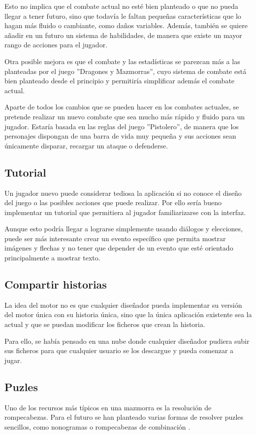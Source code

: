 Esto no implica que el combate actual no esté bien planteado o que no pueda llegar a tener futuro, sino que todavía le faltan pequeñas características que lo hagan más fluido o cambiante, como daños variables.
Además, también se quiere añadir en un futuro un sistema de habilidades, de manera que existe un mayor rango de acciones para el jugador.

Otra posible mejora es que el combate y las estadísticas se parezcan más a las planteadas por el juego ''Dragones y Mazmorras'', cuyo sistema de combate está bien planteado desde el principio y permitiría simplificar además el combate actual.

Aparte de todos los cambios que se pueden hacer en los combates actuales, se pretende realizar un nuevo combate que sea mucho más rápido y fluido para un jugador. Estaría basada en las reglas del juego ''Pistolero'', de manera que los personajes dispongan de una barra de vida muy pequeña y sus acciones sean únicamente disparar, recargar un ataque o defenderse.

\subsection{Tutorial}
Un jugador nuevo puede considerar tediosa la aplicación si no conoce el diseño del juego o las posibles acciones que puede realizar. Por ello sería bueno implementar un tutorial que permitiera al jugador familiarizarse con la interfaz.

Aunque esto podría llegar a lograrse simplemente usando diálogos y elecciones, puede ser más interesante crear un evento específico que permita mostrar imágenes y flechas y no tener que depender de un evento que esté orientado principalmente a mostrar texto.
 
\subsection{Compartir historias}
La idea del motor no es que cualquier diseñador pueda implementar su versión del motor única con su historia única, sino que la única aplicación existente sea la actual y que se puedan modificar los ficheros que crean la historia.

Para ello, se había pensado en una nube donde cualquier diseñador pudiera subir sus ficheros para que cualquier usuario se los descargue y pueda comenzar a jugar.

\subsection{Puzles}
Uno de los recursos más típicos en una mazmorra es la resolución de rompecabezas. Para el futuro se han planteado varias formas de resolver puzles sencillos, como nonogramas \cite{nonograms} o rompecabezas de combinación \cite{combinationPuzzles}.

